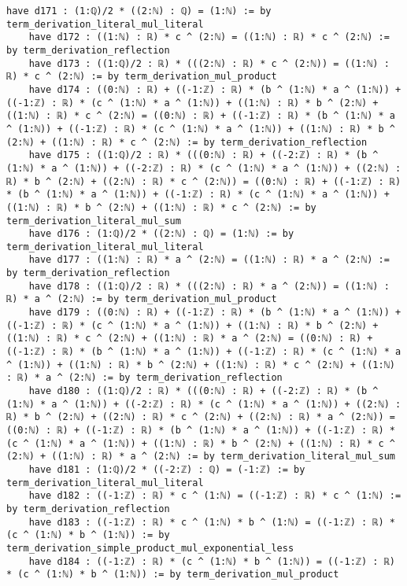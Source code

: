 \documentclass{article}
\begin{document}
\begin{tcolorbox}[colback=white!10, width=\linewidth]
\begin{lstlisting}[language=Lean4]
    have d171 : (1:ℚ)/2 * ((2:ℕ) : ℚ) = (1:ℕ) := by term_derivation_literal_mul_literal
    have d172 : ((1:ℕ) : ℝ) * c ^ (2:ℕ) = ((1:ℕ) : ℝ) * c ^ (2:ℕ) := by term_derivation_reflection
    have d173 : ((1:ℚ)/2 : ℝ) * (((2:ℕ) : ℝ) * c ^ (2:ℕ)) = ((1:ℕ) : ℝ) * c ^ (2:ℕ) := by term_derivation_mul_product
    have d174 : ((0:ℕ) : ℝ) + ((-1:ℤ) : ℝ) * (b ^ (1:ℕ) * a ^ (1:ℕ)) + ((-1:ℤ) : ℝ) * (c ^ (1:ℕ) * a ^ (1:ℕ)) + ((1:ℕ) : ℝ) * b ^ (2:ℕ) + ((1:ℕ) : ℝ) * c ^ (2:ℕ) = ((0:ℕ) : ℝ) + ((-1:ℤ) : ℝ) * (b ^ (1:ℕ) * a ^ (1:ℕ)) + ((-1:ℤ) : ℝ) * (c ^ (1:ℕ) * a ^ (1:ℕ)) + ((1:ℕ) : ℝ) * b ^ (2:ℕ) + ((1:ℕ) : ℝ) * c ^ (2:ℕ) := by term_derivation_reflection
    have d175 : ((1:ℚ)/2 : ℝ) * (((0:ℕ) : ℝ) + ((-2:ℤ) : ℝ) * (b ^ (1:ℕ) * a ^ (1:ℕ)) + ((-2:ℤ) : ℝ) * (c ^ (1:ℕ) * a ^ (1:ℕ)) + ((2:ℕ) : ℝ) * b ^ (2:ℕ) + ((2:ℕ) : ℝ) * c ^ (2:ℕ)) = ((0:ℕ) : ℝ) + ((-1:ℤ) : ℝ) * (b ^ (1:ℕ) * a ^ (1:ℕ)) + ((-1:ℤ) : ℝ) * (c ^ (1:ℕ) * a ^ (1:ℕ)) + ((1:ℕ) : ℝ) * b ^ (2:ℕ) + ((1:ℕ) : ℝ) * c ^ (2:ℕ) := by term_derivation_literal_mul_sum
    have d176 : (1:ℚ)/2 * ((2:ℕ) : ℚ) = (1:ℕ) := by term_derivation_literal_mul_literal
    have d177 : ((1:ℕ) : ℝ) * a ^ (2:ℕ) = ((1:ℕ) : ℝ) * a ^ (2:ℕ) := by term_derivation_reflection
    have d178 : ((1:ℚ)/2 : ℝ) * (((2:ℕ) : ℝ) * a ^ (2:ℕ)) = ((1:ℕ) : ℝ) * a ^ (2:ℕ) := by term_derivation_mul_product
    have d179 : ((0:ℕ) : ℝ) + ((-1:ℤ) : ℝ) * (b ^ (1:ℕ) * a ^ (1:ℕ)) + ((-1:ℤ) : ℝ) * (c ^ (1:ℕ) * a ^ (1:ℕ)) + ((1:ℕ) : ℝ) * b ^ (2:ℕ) + ((1:ℕ) : ℝ) * c ^ (2:ℕ) + ((1:ℕ) : ℝ) * a ^ (2:ℕ) = ((0:ℕ) : ℝ) + ((-1:ℤ) : ℝ) * (b ^ (1:ℕ) * a ^ (1:ℕ)) + ((-1:ℤ) : ℝ) * (c ^ (1:ℕ) * a ^ (1:ℕ)) + ((1:ℕ) : ℝ) * b ^ (2:ℕ) + ((1:ℕ) : ℝ) * c ^ (2:ℕ) + ((1:ℕ) : ℝ) * a ^ (2:ℕ) := by term_derivation_reflection
    have d180 : ((1:ℚ)/2 : ℝ) * (((0:ℕ) : ℝ) + ((-2:ℤ) : ℝ) * (b ^ (1:ℕ) * a ^ (1:ℕ)) + ((-2:ℤ) : ℝ) * (c ^ (1:ℕ) * a ^ (1:ℕ)) + ((2:ℕ) : ℝ) * b ^ (2:ℕ) + ((2:ℕ) : ℝ) * c ^ (2:ℕ) + ((2:ℕ) : ℝ) * a ^ (2:ℕ)) = ((0:ℕ) : ℝ) + ((-1:ℤ) : ℝ) * (b ^ (1:ℕ) * a ^ (1:ℕ)) + ((-1:ℤ) : ℝ) * (c ^ (1:ℕ) * a ^ (1:ℕ)) + ((1:ℕ) : ℝ) * b ^ (2:ℕ) + ((1:ℕ) : ℝ) * c ^ (2:ℕ) + ((1:ℕ) : ℝ) * a ^ (2:ℕ) := by term_derivation_literal_mul_sum
    have d181 : (1:ℚ)/2 * ((-2:ℤ) : ℚ) = (-1:ℤ) := by term_derivation_literal_mul_literal
    have d182 : ((-1:ℤ) : ℝ) * c ^ (1:ℕ) = ((-1:ℤ) : ℝ) * c ^ (1:ℕ) := by term_derivation_reflection
    have d183 : ((-1:ℤ) : ℝ) * c ^ (1:ℕ) * b ^ (1:ℕ) = ((-1:ℤ) : ℝ) * (c ^ (1:ℕ) * b ^ (1:ℕ)) := by term_derivation_simple_product_mul_exponential_less
    have d184 : ((-1:ℤ) : ℝ) * (c ^ (1:ℕ) * b ^ (1:ℕ)) = ((-1:ℤ) : ℝ) * (c ^ (1:ℕ) * b ^ (1:ℕ)) := by term_derivation_mul_product

\end{lstlisting}
\end{tcolorbox}
\end{document}
